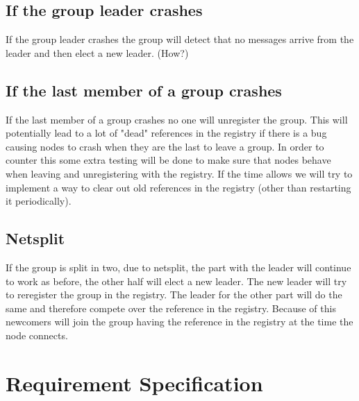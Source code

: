 \documentclass[english]{article}
\begin{document}
\subsection{If the group leader crashes}
If the group leader crashes the group will detect that no messages arrive from the leader and then elect a new leader. (How?)

\subsection{If the last member of a group crashes}
If the last member of a group crashes no one will unregister the group.
This will potentially lead to a lot of "dead" references in the registry if there is a bug causing nodes to crash when they are the last to leave a group. In order to counter this some extra testing will be done to make sure that nodes behave when leaving and unregistering with the registry.
If the time allows we will try to implement a way to clear out old references in the registry (other than restarting it periodically).

\subsection{Netsplit}
If the group is split in two, due to netsplit, the part with the leader will continue to work as before, the other half will elect a new leader.
The new leader will try to reregister the group in the registry. The leader for the other part will do the same and therefore compete over the reference in the registry. Because of this newcomers will join the group having the reference in the registry at the time the node connects.

\section{Requirement Specification}
\end{document}
